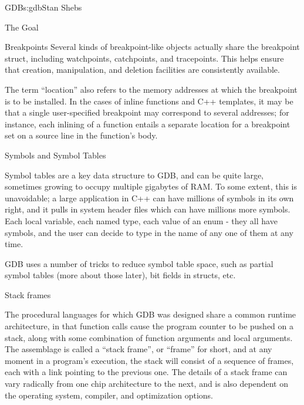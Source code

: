 \begin{aosachapter}{GDB}{s:gdb}{Stan Shebs}
\begin{aosasect1}{The Goal}
\begin{aosasect1}{Breakpoints}
Several kinds of breakpoint-like objects actually share the breakpoint
struct, including watchpoints, catchpoints, and tracepoints.  This
helps ensure that creation, manipulation, and deletion facilities are
consistently available.

The term ``location'' also refers to the memory addresses at which the
breakpoint is to be installed.  In the cases of inline functions and
C++ templates, it may be that a single user-specified breakpoint may
correspond to several addresses; for instance, each inlining of a
function entails a separate location for a breakpoint set on a source
line in the function's body.

\end{aosasect1}

\begin{aosasect1}{Symbols and Symbol Tables}

Symbol tables are a key data structure to GDB, and can be quite large,
sometimes growing to occupy multiple gigabytes of RAM.  To some
extent, this is unavoidable; a large application in C++ can have
millions of symbols in its own right, and it pulls in system header
files which can have millions more symbols.  Each local variable, each
named type, each value of an enum - they all have symbols, and the
user can decide to type in the name of any one of them at any time.

GDB uses a number of tricks to reduce symbol table space, such as
partial symbol tables (more about those later), bit fields in structs,
etc.




\end{aosasect1}

\begin{aosasect1}{Stack frames}

The procedural languages for which GDB was designed share a common
runtime architecture, in that function calls cause the program counter
to be pushed on a stack, along with some combination of function
arguments and local arguments.  The assemblage is called a ``stack
frame'', or ``frame'' for short, and at any moment in a program's
execution, the stack will consist of a sequence of frames, each with a
link pointing to the previous one.  The details of a stack frame can
vary radically from one chip architecture to the next, and is also
dependent on the operating system, compiler, and optimization options.


\end{aosasect1}
\end{aosasect1}
\end{aosachapter}
